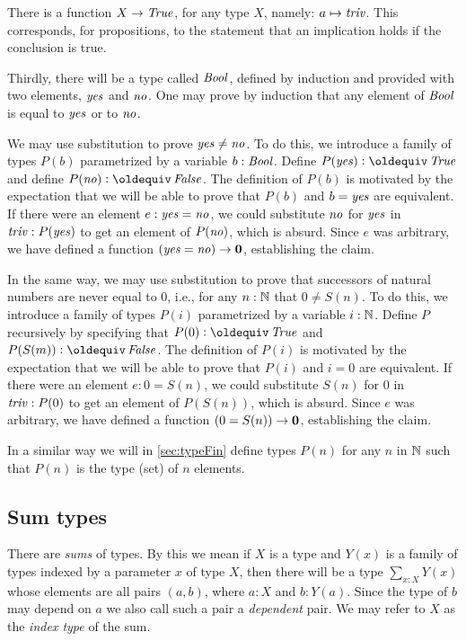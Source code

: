 There is a function $X \to \mathop{\mathit{True}}$, for any type $X$, namely: $a \mapsto \mathop{\mathit{triv}}$.  This corresponds, for propositions, to the statement that an
implication holds if the conclusion is true.

Thirdly, there will be a type called $\mathop{\mathit{Bool}}$, 
defined by induction and provided with two elements, $\mathop{\mathit{yes}}$ and $\mathop{\mathit{no}}$.  
One may prove by induction
that any element of $\mathop{\mathit{Bool}}$ is equal to $\mathop{\mathit{yes}}$ or to $\mathop{\mathit{no}}$.

We may use substitution to prove $\mathop{\mathit{yes}} \ne \mathop{\mathit{no}}$.  To do this, we introduce a family of types $P(b)$ parametrized by a variable $b:\mathop{\mathit{Bool}}$.
Define $P(\yes) \defeq \true$ and define $P(\no) \defeq \false$.  The definition of $P(b)$ is motivated by the expectation that we will be able
to prove that $P(b)$ and $b = \mathop{\mathit{yes}}$ are equivalent.  If there were an element $e: \mathop{\mathit{yes}} = \mathop{\mathit{no}}$, we could substitute $\mathop{\mathit{no}}$ for $\mathop{\mathit{yes}}$ in $\mathop{\mathit{triv}} :
P (\mathop{\mathit{yes}})$ to get an element of $P(\mathop{\mathit{no}})$, which is absurd.  Since $e$ was arbitrary, we have defined a function $(\mathop{\mathit{yes}}=\mathop{\mathit{no}}) \to \mathbf{0} $,
establishing the claim.

In the same way, we may use substitution to prove that successors of natural numbers are never equal to $0$, i.e., for any $n:\mathbb{N}$ that $0 \ne
S(n)$.  To do this, we introduce a family of types $P(i)$ parametrized by a variable $i:\mathbb{N}$.  Define $P$ recursively by specifying that $P(0)
\defeq \true$ and $P(S(m)) \defeq \false$.  The definition of $P(i)$ is motivated by the expectation that we will be able to prove that $P(i)$
and $i = 0$ are equivalent.  If there were an element $e: 0 = S(n)$, we could substitute $S(n)$ for $0$ in $\mathop{\mathit{triv}} : P ( 0 )$ to get an element
of $P(S(n))$, which is absurd.  Since $e$ was arbitrary, we have defined a function $(0=S(n)) \to \mathbf{0} $, establishing the claim.

In a similar way we will in \cref{sec:typeFin} define types $P(n)$ for any $n$ in $\mathbb{N}$
such that $P(n)$ is the type (set) of $n$ elements.

\subsection{Sum types}
\label{sec:sum-types}
There are \emph{sums} of types.  By this we mean if $X$ is a type and $Y(x)$ is a family of types indexed by a parameter $x$ of type $X$, then
there will be a type $\sum _{x:X} Y(x)$ whose elements are all pairs $(a,b)$, where $a:X$ and $b:Y(a)$. Since the type of $b$ may depend on $a$ we also call such a pair
a \emph{dependent} pair. We may refer to $X$ as the \emph{index
  type} of the sum.  

